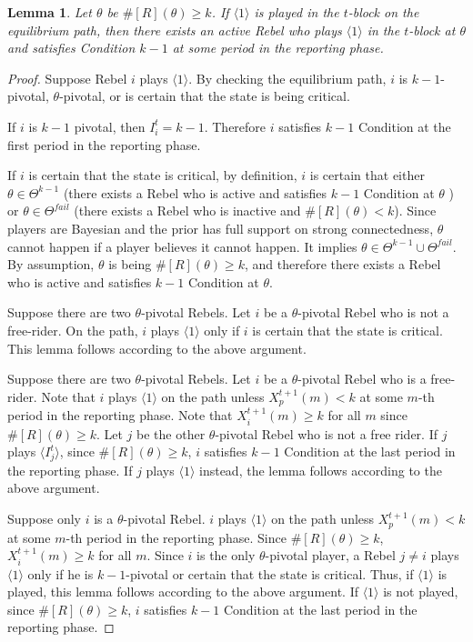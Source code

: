 \documentclass[12pt,letter]{article}
\newtheorem{lemma}{Lemma}[section]
\theoremstyle{definition}
\theoremstyle{remark}
\theoremstyle{claim}
\begin{document}
\begin{lemma} Let $\theta$ be $\#[R](\theta)\geq k$. If $\langle 1 \rangle$ is played in the $t$-block on the equilibrium path, then there exists an active Rebel who plays $\langle 1 \rangle$ in the $t$-block at $\theta$ and satisfies Condition $k-1$ at some period in the reporting phase.
\end{lemma}
\begin{proof}
Suppose Rebel $i$ plays $\langle 1 \rangle$. By checking the equilibrium path, $i$ is $k-1$-pivotal, $\theta$-pivotal, or is certain that the state is being critical.



If $i$ is $k-1$ pivotal, then $I^t_i=k-1$. Therefore $i$ satisfies $k-1$ Condition at the first period in the reporting phase.

If $i$ is certain that the state is critical, by definition, $i$ is certain that either $\theta\in \Theta^{k-1}$ (there exists a Rebel who is active and satisfies $k-1$ Condition at $\theta$ ) or $\theta\in \Theta^{fail}$ (there exists a Rebel who is inactive and $\#[R](\theta)<k$). Since players are Bayesian and the prior has full support on strong connectedness, $\theta$ cannot happen if a player believes it cannot happen. It implies $\theta\in \Theta^{k-1}\cup \Theta^{fail}$. By assumption, $\theta$ is being $\#[R](\theta)\geq k$, and therefore there exists a Rebel who is active and satisfies $k-1$ Condition at $\theta$.

Suppose there are two $\theta$-pivotal Rebels. Let $i$ be a $\theta$-pivotal Rebel who is not a free-rider. On the path, $i$ plays $\langle 1 \rangle$ only if $i$ is certain that the state is critical. This lemma follows according to the above argument.

Suppose there are two $\theta$-pivotal Rebels. Let $i$ be a $\theta$-pivotal Rebel who is a free-rider. Note that $i$ plays $\langle 1 \rangle$ on the path unless $X^{t+1}_p(m)<k$ at some $m$-th period in the reporting phase. Note that $X^{t+1}_i(m)\geq k$ for all $m$ since $\#[R](\theta)\geq k$. Let $j$ be the other $\theta$-pivotal Rebel who is not a free rider. If $j$ plays $\langle I^t_{j} \rangle$, since $\#[R](\theta)\geq k$, $i$ satisfies $k-1$ Condition at the last period in the reporting phase. If $j$ plays $\langle 1 \rangle$ instead, the lemma follows according to the above argument.

Suppose only $i$ is a $\theta$-pivotal Rebel. $i$ plays $\langle 1 \rangle$ on the path unless $X^{t+1}_p(m)<k$ at some $m$-th period in the reporting phase. Since $\#[R](\theta)\geq k$, $X^{t+1}_i(m)\geq k$ for all $m$. Since $i$ is the only $\theta$-pivotal player, a Rebel $j\neq i$ plays $\langle 1 \rangle$ only if he is $k-1$-pivotal or certain that the state is critical. Thus, if $\langle 1 \rangle$ is played, this lemma follows according to the above argument. If $\langle 1 \rangle$ is not played, since $\#[R](\theta)\geq k$, $i$ satisfies $k-1$ Condition at the last period in the reporting phase. 



\end{proof}
\end{document}
